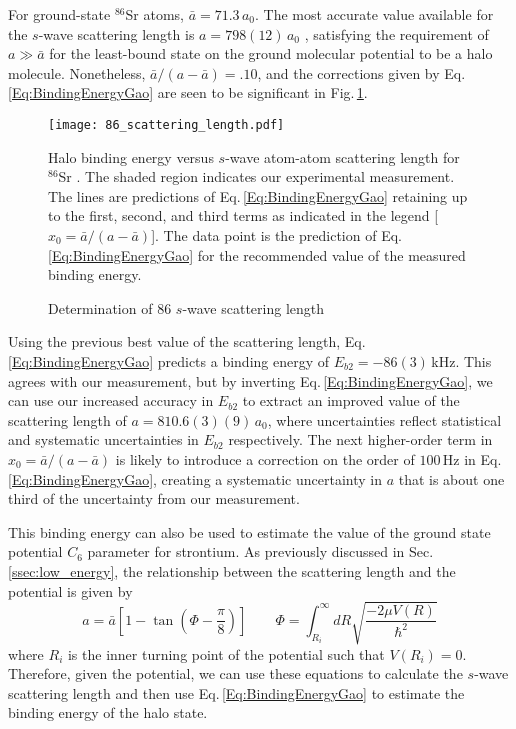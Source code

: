 For ground-state $^{86}$Sr atoms, $\bar{a}=71.3$\,$a_0$.
The most accurate value available for the $s$-wave scattering length is $a=798 (12)$\,$a_0$ \cite{Stein2010}, satisfying the requirement of $a\gg \bar{a}$ for the least-bound state on the ground molecular potential to be a halo molecule.
Nonetheless, ${\bar{a}}/({a-\bar{a}})=.10$, and the corrections given by Eq.\,\ref{Eq:BindingEnergyGao} are seen to be significant in Fig.\,\ref{fig:HaloBindingEnergy}.
	\begin{figure} 
	\centerline{
	  \texttt{[image: 86\_scattering\_length.pdf]}}
	  \caption{Determination of 86 $s$-wave scattering length}{Halo binding energy versus $s$-wave atom-atom scattering length for $^{86}$Sr . The shaded region indicates our experimental measurement. The lines are predictions of Eq.\,\ref{Eq:BindingEnergyGao} retaining up to the first, second, and third terms as indicated in the legend [$x_0={\bar{a}}/({a-\bar{a}})$]. The data point is the prediction of Eq.\,\ref{Eq:BindingEnergyGao} for the recommended value of the measured binding energy.}
	  \label{fig:HaloBindingEnergy}
	\end{figure}
Using the previous best value of the scattering length, Eq.\,\ref{Eq:BindingEnergyGao} predicts a binding energy of $E_{b2}=-86(3)$\,kHz.
This agrees with our measurement, but by inverting Eq.\,\ref{Eq:BindingEnergyGao}, we can use our increased accuracy in $E_{b2}$ to extract an improved value of the scattering length of $a=810.6(3)(9)$\,$a_0$, where uncertainties reflect statistical and systematic uncertainties in $E_{b2}$ respectively.
The next higher-order term in $x_0={\bar{a}}/({a-\bar{a}})$ is likely to introduce a correction on the order of $100$\,Hz in Eq.\,\ref{Eq:BindingEnergyGao}, creating a systematic uncertainty in $a$ that is about one third of the uncertainty from our measurement.

This binding energy can also be used to estimate the value of the ground state potential $C_6$ parameter for strontium.
As previously discussed in Sec.\,\ref{ssec:low_energy}, the relationship between the scattering length and the potential is given by
\begin{equation} \label{eq:5scatterLeng}
	a = \bar{a} \left[ 1 - \tan(\Phi - \frac{\pi}{8}) \right] \quad \quad \Phi = \int_{R_i}^{\infty} dR \sqrt{\frac{-2\mu V(R)}{\hbar^2}}
\end{equation} 
where $R_i$ is the inner turning point of the potential such that $V(R_i)=0$.
Therefore, given the potential, we can use these equations to calculate the $s$-wave scattering length and then use Eq.\,\ref{Eq:BindingEnergyGao} to estimate the binding energy of the halo state.

